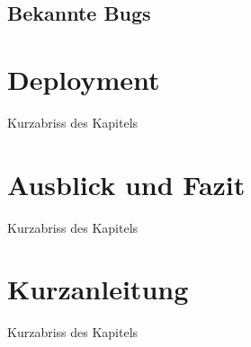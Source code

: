 \section{Bekannte Bugs}

\chapter{Deployment}

Kurzabriss des Kapitels

\chapter{Ausblick und Fazit}

Kurzabriss des Kapitels

\chapter{Kurzanleitung}

Kurzabriss des Kapitels

		
   	\cleardoublepage
   	\setcounter{page}{12}
	 
	
\begin{appendix}   
\end{appendix}
\backmatter


